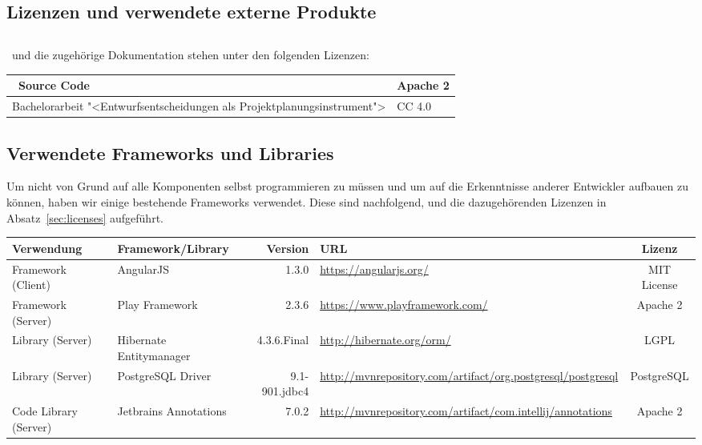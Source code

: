 \begin{landscape}
\chapter{Lizenzen und verwendete externe Produkte}
	\section{\eeppi}
	\label{sec:eeppiLisences}
		
	\eeppi\ und die zugehörige Dokumentation stehen unter den folgenden Lizenzen:
	\vspace{0.5cm}
	
	\begin{tabularx}{\linewidth}{|l|X|}
		\hline
		\eeppi\ Source Code & Apache 2\\
		\hline
		Bachelorarbeit "<Entwurfsentscheidungen als Projektplanungsinstrument"> & CC 4.0\\
		\hline
	\end{tabularx}
	

	\section{Verwendete Frameworks und Libraries}
	\label{sec:usedLibrariesAndFrameworks}
	Um nicht von Grund auf alle Komponenten selbst programmieren zu müssen 
	und um auf die Erkenntnisse anderer Entwickler aufbauen zu können,
	haben wir einige bestehende Frameworks verwendet.
	Diese sind nachfolgend, und die dazugehörenden Lizenzen in Absatz~\ref{sec:licenses} aufgeführt.
	
	
	\vspace{0.5cm}
	
	\newcommand{\addLib}[5]{
		#5 & #1 & #2 & \url{#3} & #4 \\
		\hline
	}
	
	
	\begin{tabularx}{\linewidth}{| l | l r | X | c |}
		\hline
		\textbf{Verwendung} & \textbf{Framework/Library} & \textbf{Version} & \textbf{URL} & \textbf{Lizenz} \\
		\hline \hline
		\addLib{AngularJS}{1.3.0}{https://angularjs.org/}{MIT License}{Framework (Client)}
		\addLib{Play Framework}{2.3.6}{https://www.playframework.com/}{Apache 2}{Framework (Server)}
		\addLib{Hibernate Entitymanager}{4.3.6.Final}{http://hibernate.org/orm/}{LGPL}{Library (Server)}
		\addLib{PostgreSQL Driver}{9.1-901.jdbc4}{http://mvnrepository.com/artifact/org.postgresql/postgresql}{PostgreSQL}{Library (Server)}
		\addLib{Jetbrains Annotations}{7.0.2}{http://mvnrepository.com/artifact/com.intellij/annotations}{Apache 2}{Code Library (Server)}
	\end{tabularx}
		

\end{landscape}
